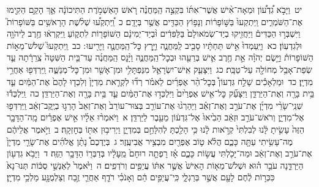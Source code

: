 \documentclass[18pt]{article}
\newcommand{\vart}[1]{\Bfootnote{#1}}	%
\newcommand{\kri}[1]{\Afootnote{#1}}	%
\begin{document}
 {\loc יט~}וַיָּבֹ֣א גִ֠דְע֠וֹן וּמֵאָה־אִ֨ישׁ אֲשֶׁר־אִתּ֜וֹ בִּקְצֵ֣ה הַֽמַּחֲנֶ֗ה רֹ֚אשׁ הָאַשְׁמֹ֣רֶת הַתִּיכוֹנָ֔ה אַ֛ךְ הָקֵ֥ם הֵקִ֖ימוּ אֶת־הַשֹּׁמְרִ֑ים וַֽיִּתְקְעוּ֙ בַּשּׁ֣וֹפָר֔וֹת וְנָפ֥וֹץ הַכַּדִּ֖ים אֲשֶׁ֥ר בְּיָדָֽם׃ \startlock
 {\loc כ~}וַֽ֠יִּתְקְע֠וּ שְׁלֹ֨שֶׁת הָרָאשִׁ֥ים בַּשּׁוֹפָרוֹת֮ וַיִּשְׁבְּר֣וּ הַכַּדִּים֒ וַיַּחֲזִ֤יקוּ בְיַד־שְׂמֹאולָם֙ בַּלַּפִּדִ֔ים וּ֨בְיַד־יְמִינָ֔ם הַשּׁוֹפָר֖וֹת לִתְק֑וֹעַ וַֽיִּקְרְא֔וּ חֶ֥רֶב לַיהֹוָ֖ה וּלְגִדְעֽוֹן׃ \startlock
 {\loc כא~}וַיַּֽעַמְדוּ֙ אִ֣ישׁ תַּחְתָּ֔יו סָבִ֖יב לַֽמַּחֲנֶ֑ה וַיָּ֧רׇץ כׇּל־הַֽמַּחֲנֶ֛ה וַיָּרִ֖יעוּ  \edtext{(ויניסו)}{\kri{קרי: וַיָּנֽוּסוּ}} ׃ \startlock
 {\loc כב~}וַֽיִּתְקְעוּ֮ שְׁלֹשׁ־מֵא֣וֹת הַשּׁוֹפָרוֹת֒ וַיָּ֣שֶׂם יְהֹוָ֗ה אֵ֣ת חֶ֥רֶב אִ֛ישׁ בְּרֵעֵ֖הוּ וּבְכׇל־הַֽמַּחֲנֶ֑ה וַיָּ֨נׇס הַֽמַּחֲנֶ֜ה עַד־בֵּ֤ית הַשִּׁטָּה֙ צְֽרֵרָ֔תָה עַ֛ד שְׂפַת־אָבֵ֥ל מְחוֹלָ֖ה עַל־טַבָּֽת׃ \startlock
 {\loc כג~}וַיִּצָּעֵ֧ק אִֽישׁ־יִשְׂרָאֵ֛ל מִנַּפְתָּלִ֥י וּמִן־אָשֵׁ֖ר וּמִן־כׇּל־מְנַשֶּׁ֑ה וַֽיִּרְדְּפ֖וּ אַחֲרֵ֥י מִדְיָֽן׃ \startlock
 {\loc כד~}וּמַלְאָכִ֡ים שָׁלַ֣ח גִּדְעוֹן֩ בְּכׇל־הַ֨ר אֶפְרַ֜יִם לֵאמֹ֗ר רְד֞וּ לִקְרַ֤את מִדְיָן֙ וְלִכְד֤וּ לָהֶם֙ אֶת־הַמַּ֔יִם עַ֛ד בֵּ֥ית בָּרָ֖ה וְאֶת־הַיַּרְדֵּ֑ן וַיִּצָּעֵ֞ק כׇּל־אִ֤ישׁ אֶפְרַ֙יִם֙ וַיִּלְכְּד֣וּ אֶת־הַמַּ֔יִם עַ֛ד בֵּ֥ית בָּרָ֖ה וְאֶת־הַיַּרְדֵּֽן׃ \startlock
 {\loc כה~}וַֽיִּלְכְּד֡וּ שְׁנֵֽי־שָׂרֵ֨י מִדְיָ֜ן אֶת־עֹרֵ֣ב וְאֶת־זְאֵ֗ב וַיַּהַרְג֨וּ אֶת־עוֹרֵ֤ב בְּצוּר־עוֹרֵב֙ וְאֶת־זְאֵב֙ הָרְג֣וּ בְיֶֽקֶב־זְאֵ֔ב וַֽיִּרְדְּפ֖וּ אֶל־מִדְיָ֑ן וְרֹאשׁ־עֹרֵ֣ב וּזְאֵ֔ב הֵבִ֙יאוּ֙ אֶל־גִּדְע֔וֹן מֵעֵ֖בֶר לַיַּרְדֵּֽן׃ 
\startlock
 {\loc א~}וַיֹּאמְר֨וּ אֵלָ֜יו אִ֣ישׁ אֶפְרַ֗יִם מָֽה־הַדָּבָ֤ר הַזֶּה֙ עָשִׂ֣יתָ לָּ֔נוּ לְבִלְתִּי֙ קְרֹ֣אות לָ֔נוּ כִּ֥י הָלַ֖כְתָּ לְהִלָּחֵ֣ם בְּמִדְיָ֑ן וַיְרִיב֥וּן אִתּ֖וֹ בְּחׇזְקָֽה׃ \startlock
 {\loc ב~}וַיֹּ֣אמֶר אֲלֵיהֶ֔ם מֶה־עָשִׂ֥יתִי עַתָּ֖ה כָּכֶ֑ם הֲלֹ֗א ט֛וֹב  \edtext{עֹלְל֥וֹת}{\vart{א=עֹלֲל֥וֹת | }}  אֶפְרַ֖יִם מִבְצִ֥יר אֲבִיעֶֽזֶר׃ \startlock
 {\loc ג~}בְּיֶדְכֶם֩ נָתַ֨ן אֱלֹהִ֜ים אֶת־שָׂרֵ֤י מִדְיָן֙ אֶת־עֹרֵ֣ב וְאֶת־זְאֵ֔ב וּמַה־יָּכֹ֖לְתִּי עֲשׂ֣וֹת כָּכֶ֑ם אָ֗ז רָפְתָ֤ה רוּחָם֙ מֵֽעָלָ֔יו בְּדַבְּר֖וֹ הַדָּבָ֥ר הַזֶּֽה׃ \startlock
 {\loc ד~}וַיָּבֹ֥א גִדְע֖וֹן הַיַּרְדֵּ֑נָה עֹבֵ֣ר ה֗וּא וּשְׁלֹשׁ־מֵא֤וֹת הָאִישׁ֙ אֲשֶׁ֣ר אִתּ֔וֹ עֲיֵפִ֖ים וְרֹדְפִֽים׃ \startlock
 {\loc ה~}וַיֹּ֙אמֶר֙ לְאַנְשֵׁ֣י סֻכּ֔וֹת תְּנוּ־נָא֙ כִּכְּר֣וֹת לֶ֔חֶם לָעָ֖ם אֲשֶׁ֣ר בְּרַגְלָ֑י כִּֽי־עֲיֵפִ֣ים הֵ֔ם וְאָנֹכִ֗י רֹדֵ֛ף אַחֲרֵ֛י זֶ֥בַח וְצַלְמֻנָּ֖ע מַלְכֵ֥י מִדְיָֽן׃ \startlock
\end{document}
